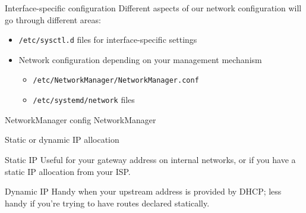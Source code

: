 \documentclass[bigger,aspectratio=169]{beamer}
\begin{document}
\begin{frame}{Interface-specific configuration}
  Different aspects of our network configuration will go through different areas:
  \begin{itemize}
  \item<2-> \texttt{/etc/sysctl.d} files for interface-specific settings
  \item<3-> Network configuration depending on your management mechanism
    \begin{itemize}
    \item<4-> \texttt{/etc/NetworkManager/NetworkManager.conf}
    \item<5-> \texttt{/etc/systemd/network} files
    \end{itemize}
  \end{itemize}
\end{frame}


\begin{frame}{NetworkManager config}
  NetworkManager 

\begin{block}{Static or dynamic IP allocation}
\begin{block}{Static IP}
Useful for your gateway address on internal networks, or if you have a
static IP allocation from your ISP.
\end{block}

\begin{block}{Dynamic IP}
Handy when your upstream address is provided by DHCP; less handy if you're
trying to have routes declared statically.
\end{block}
\end{block}
\end{frame}
\end{document}
